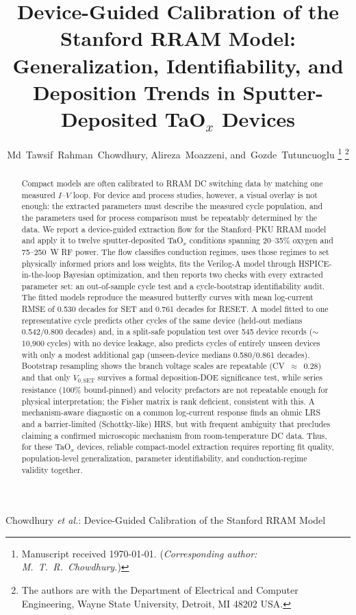 \documentclass[journal]{IEEEtran}
\begin{document}
\title{Device-Guided Calibration of the Stanford RRAM Model:
Generalization, Identifiability, and Deposition Trends in
Sputter-Deposited TaO$_x$ Devices}

\author{Md~Tawsif~Rahman~Chowdhury,
        Alireza~Moazzeni,
        and~Gozde~Tutuncuoglu%
\thanks{Manuscript received \today. (\emph{Corresponding author:
M.~T.~R.~Chowdhury.})}%
\thanks{The authors are with the Department of Electrical and Computer
Engineering, Wayne State University, Detroit, MI 48202 USA.}}

%
{Chowdhury \MakeLowercase{\textit{et al.}}: Device-Guided Calibration of the Stanford RRAM Model}

\maketitle

\begin{abstract}
Compact models are often calibrated to RRAM DC switching data by matching one
measured $I$--$V$ loop.  For device and process studies, however, a visual
overlay is not enough: the extracted parameters must describe the measured
cycle population, and the parameters used for process comparison must be
repeatably determined by the data.  We report a device-guided extraction flow
for the Stanford--PKU RRAM model and apply it to twelve sputter-deposited
TaO$_x$ conditions spanning 20--35\% oxygen and 75--250~W RF power.  The flow
classifies conduction regimes, uses those regimes to set physically informed
priors and loss weights, fits the Verilog-A model through HSPICE-in-the-loop
Bayesian optimization, and then reports two checks with every extracted
parameter set: an out-of-sample cycle test and a cycle-bootstrap
identifiability audit.  The fitted models reproduce the measured butterfly
curves with mean log-current RMSE of 0.530 decades for SET and 0.761 decades
for RESET.  A model fitted to one representative cycle predicts other cycles of
the same device (held-out medians 0.542/0.800 decades) and, in a split-safe
population test over 545 device records ($\sim$10{,}900 cycles) with no device
leakage, also predicts cycles of entirely unseen devices with only a modest
additional gap (unseen-device medians 0.580/0.861 decades).  Bootstrap
resampling shows the branch voltage scales are repeatable (CV~$\approx$~0.28)
and that only $V_{0,\mathrm{SET}}$ survives a formal deposition-DOE significance
test, while series resistance (100\% bound-pinned) and velocity prefactors are
not repeatable enough for physical interpretation; the Fisher matrix is rank
deficient, consistent with this.  A mechanism-aware diagnostic on a common
log-current response finds an ohmic LRS and a barrier-limited (Schottky-like)
HRS, but with frequent ambiguity that precludes claiming a confirmed microscopic
mechanism from room-temperature DC data.  Thus, for these TaO$_x$ devices,
reliable compact-model extraction requires reporting fit quality, population-level
generalization, parameter identifiability, and conduction-regime validity
together.
\end{abstract}
\end{document}
